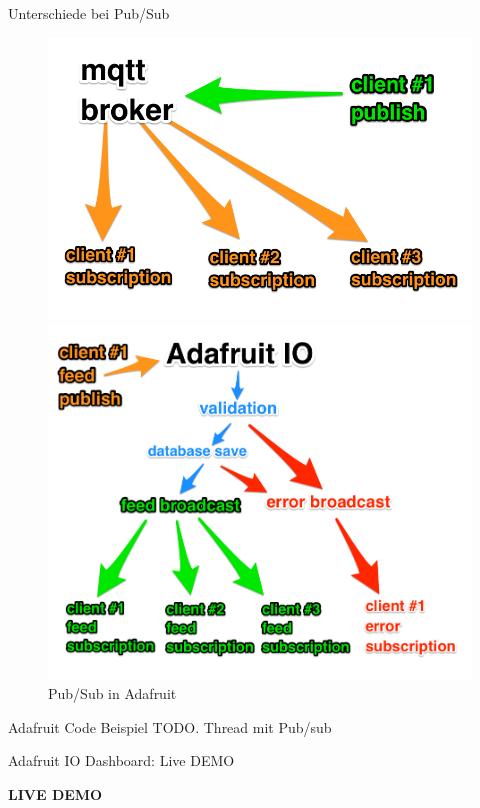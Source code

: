 \begin{frame}{Unterschiede bei Pub/Sub}
	\begin{figure}
	\centering
	\parbox{5cm}{
		\includegraphics[scale=0.19]{7-datenaustausch/img/mqtt-pubsub}
		\caption{Pub/Sub in MQTT}
		\label{fig:pubsubmqtt}
		}
	\qquad
	\begin{minipage}{5cm}
		\includegraphics[scale=0.15]{7-datenaustausch/img/adafruit-pubsub}
		\caption{Pub/Sub in Adafruit}
		\label{fig:pubsubadafruit}
	\end{minipage}
	\end{figure}
\end{frame}

\begin{frame}{Adafruit Code Beispiel}
     TODO. Thread mit Pub/sub
 \end{frame}

\begin{frame}{Adafruit IO Dashboard: Live DEMO}
      \centering
  	\begin{Huge}
      		\textbf{LIVE DEMO}
	\end{Huge}
\end{frame}



